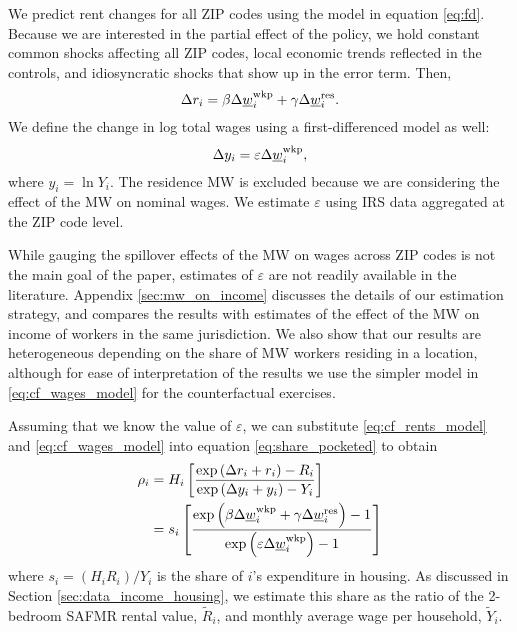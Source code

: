 We predict rent changes for all ZIP codes using the model in equation 
\eqref{eq:fd}.
Because we are interested in the partial effect of the policy, we hold constant 
common shocks affecting all ZIP codes,
local economic trends reflected in the controls, and
idiosyncratic shocks that show up in the error term.
Then,
\begin{equation}\label{eq:cf_rents_model}
    \Delta r_i = \beta \Delta \underline{w}_i^{\text{wkp}} + \gamma \Delta \underline{w}_i^{\text{res}} .
\end{equation}
We define the change in log total wages using a first-differenced model as well:
\begin{equation}\label{eq:cf_wages_model}
    \Delta y_i = \varepsilon \Delta \underline{w}_i^{\text{wkp}} ,
\end{equation}
where $y_i=\ln Y_i$.
The residence MW is excluded because we are considering the effect of the MW on 
nominal wages.
We estimate $\varepsilon$ using IRS data aggregated at the ZIP code level.

While gauging the spillover effects of the MW on wages across ZIP codes is 
not the main goal of the paper, estimates of $\varepsilon$ are not readily 
available in the literature.
Appendix \ref{sec:mw_on_income} discusses the details of our estimation 
strategy, and compares the results with estimates of the effect of the MW 
on income of workers in the same jurisdiction.
We also show that our results are heterogeneous depending on the share of 
MW workers residing in a location, although for ease of interpretation of the
results we use the simpler model in \eqref{eq:cf_wages_model} for the 
counterfactual exercises.

Assuming that we know the value of $\varepsilon$, we can substitute
\eqref{eq:cf_rents_model} and \eqref{eq:cf_wages_model} into equation
\eqref{eq:share_pocketed} to obtain
\begin{equation*}\label{eq:rho}
    \begin{split}
        \rho_i & = H_i \left[ 
        \frac{\exp \left(\Delta r_i + r_i \right) - R_i }
             {\exp \left(\Delta y_i + y_i \right) - Y_i }
        \right] \\
        & = s_i \left[
            \frac{\exp \left( \beta \Delta \underline{w}_i^{\text{wkp}} + \gamma \Delta \underline{w}_i^{\text{res}} \right) - 1 }
                {\exp \left( \varepsilon \Delta \underline{w}_i^{\text{wkp}} \right) - 1 }
            \right]
    \end{split}
\end{equation*}
where $s_i = \left(H_i R_i\right)/Y_i$ is the share of $i$'s expenditure in 
housing.
As discussed in Section \ref{sec:data_income_housing},
we estimate this share as the ratio of the 2-bedroom SAFMR rental value, 
$\tilde R_i$, and monthly average wage per household, $\tilde Y_i$.

